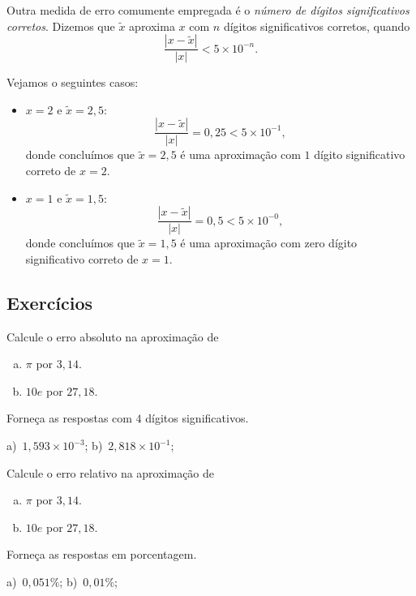 Outra medida de erro comumente empregada é o \emph{número de dígitos significativos corretos}. Dizemos que $\tilde{x}$ aproxima $x$ com $n$ dígitos significativos corretos, quando
\begin{equation}
  \frac{|x - \tilde{x}|}{|x|} < 5\times 10^{-n}.
\end{equation}

\begin{ex}\label{ex:numdigsigcorr}
  Vejamos o seguintes casos:
  \begin{itemize}
  \item $x=2$ e $\tilde{x} = 2,5$:
    \begin{equation}
      \frac{|x - \tilde{x}|}{|x|} = 0,25 < 5\times 10^{-1},
    \end{equation}
donde concluímos que $\tilde{x}=2,5$ é uma aproximação com $1$ dígito significativo correto de $x=2$.
  \item $x=1$ e $\tilde{x} = 1,5$:
    \begin{equation}
      \frac{|x - \tilde{x}|}{|x|} = 0,5 < 5\times 10^{-0},
    \end{equation}
donde concluímos que $\tilde{x}=1,5$ é uma aproximação com zero dígito significativo correto de $x=1$.
  \end{itemize}
\end{ex}

\subsection*{Exercícios}

\begin{exer}\label{exer:erro_abs}
  Calcule o erro absoluto na aproximação de
  \begin{enumerate}[a)]
  \item $\pi$ por $3,14$.
  \item $10e$ por $27,18$.
  \end{enumerate}
  Forneça as respostas com $4$ dígitos significativos.
\end{exer}
\begin{resp}

  a)~$1,593\times 10^{-3}$; b)~$2,818\times 10^{-1}$;
\end{resp}

\begin{exer}\label{exer:erro_rel}
  Calcule o erro relativo na aproximação de
  \begin{enumerate}[a)]
  \item $\pi$ por $3,14$.
  \item $10e$ por $27,18$.
  \end{enumerate}
  Forneça as respostas em porcentagem.
\end{exer}
\begin{resp}

  a)~$0,051\%$; b)~$0,01\%$;
\end{resp}

